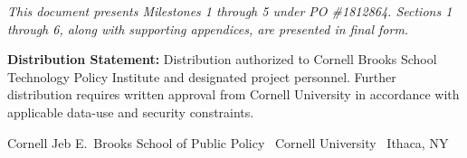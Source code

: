 \begin{titlepage}
{\footnotesize\color{cornellgray}\textit{This document presents Milestones 1 through 5 under PO \#1812864. Sections 1 through 6, along with supporting appendices, are presented in final form.}}\par

\vspace{0.20in}

{\footnotesize\color{cornellgray}\textbf{Distribution Statement:} Distribution authorized to Cornell Brooks School Technology Policy Institute and designated project personnel. Further distribution requires written approval from Cornell University in accordance with applicable data-use and security constraints.}\par

\vspace{0.15in}

\noindent\colorbox{carnelian}{%
  \parbox{\dimexpr\textwidth-2\fboxsep}{%
    \centering\vspace{4pt}%
    {\footnotesize\color{white}Cornell Jeb E.\ Brooks School of Public Policy \textbar\ Cornell University \textbar\ Ithaca, NY}%
    \vspace{4pt}%
  }%
}\par

\end{titlepage}
\clearpage
